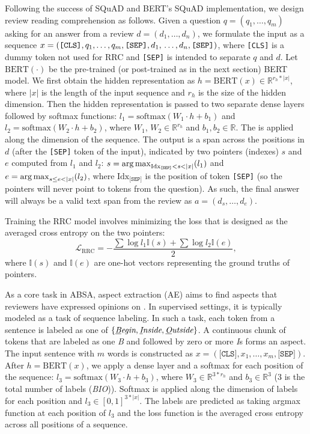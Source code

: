 Following the success of SQuAD \cite{rajpurkar2016squad} and BERT's SQuAD implementation, we design review reading comprehension as follows.
Given a question $q=(q_1, \dots, q_m)$ asking for an answer from a review $d=(d_1, \dots, d_n)$, we formulate the input as a sequence $x=(\texttt{[CLS]}, q_1, \dots, q_m, \texttt{[SEP]}, d_1, \\ \dots, d_n, \texttt{[SEP]})$, where \texttt{[CLS]} is a dummy token not used for RRC and \texttt{[SEP]} is intended to separate $q$ and $d$.
Let $\text{BERT}(\cdot)$ be the pre-trained (or post-trained as in the next section) BERT model. We first obtain the hidden representation as $h=\text{BERT}(x) \in \mathbb{R}^{r_h*|x|}$, where $|x|$ is the length of the input sequence and $r_h$ is the size of the hidden dimension. Then the hidden representation is passed to two separate dense layers followed by softmax functions: $l_1=\text{softmax}(W_1 \cdot h + b_1)$ and $l_2=\text{softmax}(W_2 \cdot h + b_2)$, where $W_1$, $W_2 \in \mathbb{R}^{r_h}$ and $b_1, b_2 \in \mathbb{R}$. The  is applied along the dimension of the sequence.
The output is a span across the positions in $d$ (after the \texttt{[SEP]} token of the input), indicated by two pointers (indexes) $s$ and $e$ computed from $l_1$ and $l_2$: $s=\argmax_{ \text{Idx}_{\texttt{[SEP]}} < s<|x|}(l_1)$ and $e=\argmax_{s\le e<|x|}(l_2)$, where $\text{Idx}_{\texttt{[SEP]}}$ is the position of token \texttt{[SEP]} (so the pointers will never point to tokens from the question).
As such, the final answer will always be a valid text span from the review as $a=(d_s, \dots, d_e)$.

Training the RRC model involves minimizing the loss that is designed as the averaged cross entropy on the two pointers: $$\mathcal{L}_{\text{RRC}}=-\frac{\sum \log l_1 \mathbb{I}(s)+ \sum \log l_2 \mathbb{I}(e)}{2},$$ where $\mathbb{I}(s)$ and $\mathbb{I}(e)$ are one-hot vectors representing the ground truths of pointers.

As a core task in ABSA, aspect extraction (AE) aims to find aspects that reviewers have expressed opinions on \cite{hu2004mining}. 
In supervised settings, it is typically modeled as a task of sequence labeling.
In such a task, each token from a sentence is labeled as one of $\{\textit{\underline{B}egin}, \textit{\underline{I}nside}, \textit{\underline{O}utside}\}$. A continuous chunk of tokens that are labeled as one \textit{B} and followed by zero or more \textit{I}s forms an aspect.
The input sentence with $m$ words is constructed as $x=(\texttt{[CLS]}, x_1, \dots, x_m, \texttt{[SEP]})$.
After $h=\text{BERT}(x)$, we apply a dense layer and a softmax for each position of the sequence: $l_3=\text{softmax}(W_3 \cdot h + b_3)$, where $W_3 \in \mathbb{R}^{3*r_h}$ and $b_3 \in \mathbb{R}^3$ (3 is the total number of labels (\textit{BIO})).  Softmax is applied along the dimension of labels for each position and $l_3 \in [0, 1]^{3*|x|}$. The labels are predicted as taking argmax function at each position of $l_3$ and the loss function is the averaged cross entropy across all positions of a sequence.

